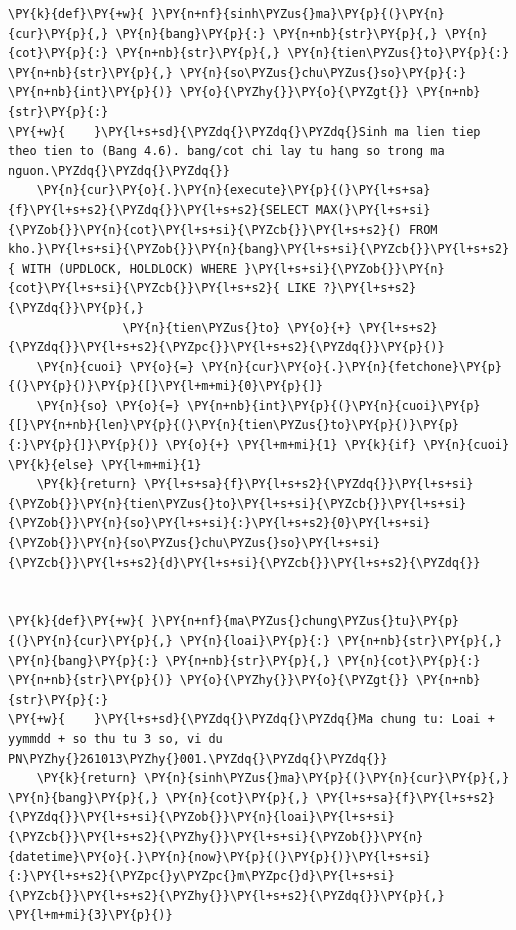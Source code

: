 \begin{Verbatim}[commandchars=\\\{\},frame=single,framerule=0.3pt,rulecolor=\color{black!40},fontsize=\footnotesize,breaklines=true]
\PY{k}{def}\PY{+w}{ }\PY{n+nf}{sinh\PYZus{}ma}\PY{p}{(}\PY{n}{cur}\PY{p}{,} \PY{n}{bang}\PY{p}{:} \PY{n+nb}{str}\PY{p}{,} \PY{n}{cot}\PY{p}{:} \PY{n+nb}{str}\PY{p}{,} \PY{n}{tien\PYZus{}to}\PY{p}{:} \PY{n+nb}{str}\PY{p}{,} \PY{n}{so\PYZus{}chu\PYZus{}so}\PY{p}{:} \PY{n+nb}{int}\PY{p}{)} \PY{o}{\PYZhy{}}\PY{o}{\PYZgt{}} \PY{n+nb}{str}\PY{p}{:}
\PY{+w}{    }\PY{l+s+sd}{\PYZdq{}\PYZdq{}\PYZdq{}Sinh ma lien tiep theo tien to (Bang 4.6). bang/cot chi lay tu hang so trong ma nguon.\PYZdq{}\PYZdq{}\PYZdq{}}
    \PY{n}{cur}\PY{o}{.}\PY{n}{execute}\PY{p}{(}\PY{l+s+sa}{f}\PY{l+s+s2}{\PYZdq{}}\PY{l+s+s2}{SELECT MAX(}\PY{l+s+si}{\PYZob{}}\PY{n}{cot}\PY{l+s+si}{\PYZcb{}}\PY{l+s+s2}{) FROM kho.}\PY{l+s+si}{\PYZob{}}\PY{n}{bang}\PY{l+s+si}{\PYZcb{}}\PY{l+s+s2}{ WITH (UPDLOCK, HOLDLOCK) WHERE }\PY{l+s+si}{\PYZob{}}\PY{n}{cot}\PY{l+s+si}{\PYZcb{}}\PY{l+s+s2}{ LIKE ?}\PY{l+s+s2}{\PYZdq{}}\PY{p}{,}
                \PY{n}{tien\PYZus{}to} \PY{o}{+} \PY{l+s+s2}{\PYZdq{}}\PY{l+s+s2}{\PYZpc{}}\PY{l+s+s2}{\PYZdq{}}\PY{p}{)}
    \PY{n}{cuoi} \PY{o}{=} \PY{n}{cur}\PY{o}{.}\PY{n}{fetchone}\PY{p}{(}\PY{p}{)}\PY{p}{[}\PY{l+m+mi}{0}\PY{p}{]}
    \PY{n}{so} \PY{o}{=} \PY{n+nb}{int}\PY{p}{(}\PY{n}{cuoi}\PY{p}{[}\PY{n+nb}{len}\PY{p}{(}\PY{n}{tien\PYZus{}to}\PY{p}{)}\PY{p}{:}\PY{p}{]}\PY{p}{)} \PY{o}{+} \PY{l+m+mi}{1} \PY{k}{if} \PY{n}{cuoi} \PY{k}{else} \PY{l+m+mi}{1}
    \PY{k}{return} \PY{l+s+sa}{f}\PY{l+s+s2}{\PYZdq{}}\PY{l+s+si}{\PYZob{}}\PY{n}{tien\PYZus{}to}\PY{l+s+si}{\PYZcb{}}\PY{l+s+si}{\PYZob{}}\PY{n}{so}\PY{l+s+si}{:}\PY{l+s+s2}{0}\PY{l+s+si}{\PYZob{}}\PY{n}{so\PYZus{}chu\PYZus{}so}\PY{l+s+si}{\PYZcb{}}\PY{l+s+s2}{d}\PY{l+s+si}{\PYZcb{}}\PY{l+s+s2}{\PYZdq{}}


\PY{k}{def}\PY{+w}{ }\PY{n+nf}{ma\PYZus{}chung\PYZus{}tu}\PY{p}{(}\PY{n}{cur}\PY{p}{,} \PY{n}{loai}\PY{p}{:} \PY{n+nb}{str}\PY{p}{,} \PY{n}{bang}\PY{p}{:} \PY{n+nb}{str}\PY{p}{,} \PY{n}{cot}\PY{p}{:} \PY{n+nb}{str}\PY{p}{)} \PY{o}{\PYZhy{}}\PY{o}{\PYZgt{}} \PY{n+nb}{str}\PY{p}{:}
\PY{+w}{    }\PY{l+s+sd}{\PYZdq{}\PYZdq{}\PYZdq{}Ma chung tu: Loai + yymmdd + so thu tu 3 so, vi du PN\PYZhy{}261013\PYZhy{}001.\PYZdq{}\PYZdq{}\PYZdq{}}
    \PY{k}{return} \PY{n}{sinh\PYZus{}ma}\PY{p}{(}\PY{n}{cur}\PY{p}{,} \PY{n}{bang}\PY{p}{,} \PY{n}{cot}\PY{p}{,} \PY{l+s+sa}{f}\PY{l+s+s2}{\PYZdq{}}\PY{l+s+si}{\PYZob{}}\PY{n}{loai}\PY{l+s+si}{\PYZcb{}}\PY{l+s+s2}{\PYZhy{}}\PY{l+s+si}{\PYZob{}}\PY{n}{datetime}\PY{o}{.}\PY{n}{now}\PY{p}{(}\PY{p}{)}\PY{l+s+si}{:}\PY{l+s+s2}{\PYZpc{}y\PYZpc{}m\PYZpc{}d}\PY{l+s+si}{\PYZcb{}}\PY{l+s+s2}{\PYZhy{}}\PY{l+s+s2}{\PYZdq{}}\PY{p}{,} \PY{l+m+mi}{3}\PY{p}{)}



\end{Verbatim}
